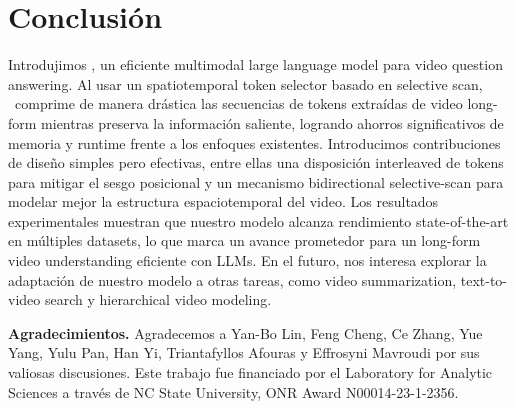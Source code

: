 \section{Conclusión}

Introdujimos \model, un eficiente multimodal large language model para video question answering. Al usar un spatiotemporal token selector basado en selective scan, \model\ comprime de manera drástica las secuencias de tokens extraídas de video long-form mientras preserva la información saliente, logrando ahorros significativos de memoria y runtime frente a los enfoques existentes. Introducimos contribuciones de diseño simples pero efectivas, entre ellas una disposición interleaved de tokens para mitigar el sesgo posicional y un mecanismo bidirectional selective-scan para modelar mejor la estructura espaciotemporal del video. Los resultados experimentales muestran que nuestro modelo alcanza rendimiento state-of-the-art en múltiples datasets, lo que marca un avance prometedor para un long-form video understanding eficiente con LLMs. En el futuro, nos interesa explorar la adaptación de nuestro modelo a otras tareas, como video summarization, text-to-video search y hierarchical video modeling.

\noindent\textbf{Agradecimientos.} Agradecemos a Yan-Bo Lin, Feng Cheng, Ce Zhang, Yue Yang, Yulu Pan, Han Yi, Triantafyllos Afouras y Effrosyni Mavroudi por sus valiosas discusiones. Este trabajo fue financiado por el Laboratory for Analytic Sciences a través de NC State University, ONR Award N00014-23-1-2356.
